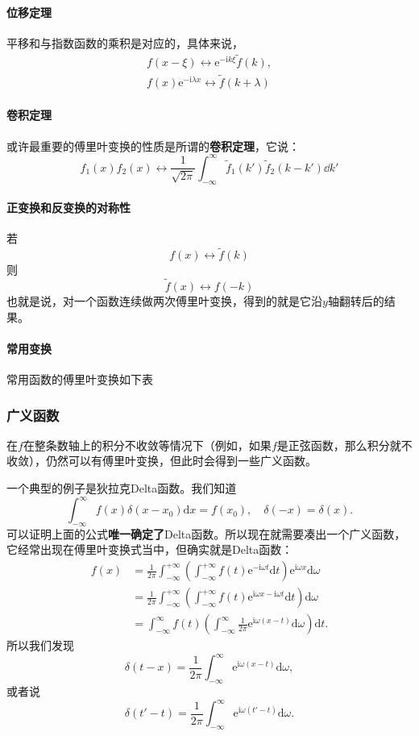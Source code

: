 \documentclass[UTF8]{ctexart}
\newcommand*{\ii}{\mathrm{i}}
\newcommand*{\ee}{\mathrm{e}}
\begin{document}
\paragraph{位移定理} 平移和与指数函数的乘积是对应的，具体来说，
\[
    \begin{split}
        f(x - \xi) \longleftrightarrow \ee^{-\ii k \xi} \tilde{f}(k), \\
        f(x) \ee^{-\ii \lambda x} \longleftrightarrow \tilde{f}(k + \lambda)
    \end{split}
\]

\paragraph{卷积定理} 或许最重要的傅里叶变换的性质是所谓的\textbf{卷积定理}，它说：
\[
    f_1(x) f_2(x) \longleftrightarrow \frac{1}{\sqrt{2\pi}} \int_{-\infty}^\infty \tilde{f}_1(k') \tilde{f}_2(k - k') \dd k'
\]

\paragraph{正变换和反变换的对称性} 若
\[
    f(x) \longleftrightarrow \tilde{f}(k)
\]
则
\[
    \tilde{f}(x) \longleftrightarrow f(-k)
\] 
也就是说，对一个函数连续做两次傅里叶变换，得到的就是它沿$y$轴翻转后的结果。

\paragraph{常用变换} 常用函数的傅里叶变换如下表


\subsubsection{广义函数}

在$f$在整条数轴上的积分不收敛等情况下（例如，如果$f$是正弦函数，那么积分就不收敛），仍然可以有傅里叶变换，但此时会得到一些广义函数。

一个典型的例子是狄拉克Delta函数。我们知道
\[
\int_{-\infty}^\infty f(x) \delta(x-x_0) \mathrm{d}x = f(x_0), \quad \delta(-x) = \delta(x).
\]
可以证明上面的公式\textbf{唯一确定了}Delta函数。所以现在就需要凑出一个广义函数，它经常出现在傅里叶变换式当中，但确实就是Delta函数：
\[
\begin{aligned}
    f(x) &= \frac{1}{2\pi} \int_{-\infty}^{+\infty} \left(\int_{-\infty}^{+\infty} f(t) \ee^{-\mathrm{i} \omega t} \mathrm{d}t \right) \ee^{\mathrm{i} \omega x} \mathrm{d} \omega \\
    &= \frac{1}{2\pi} \int_{-\infty}^{+\infty} \left(\int_{-\infty}^{+\infty} f(t) \ee^{\mathrm{i} \omega x -\mathrm{i} \omega t} \mathrm{d}t \right) \mathrm{d} \omega \\
    &= \int_{-\infty}^\infty f(t) \left( \int_{-\infty}^\infty \frac{1}{2\pi} \ee^{\mathrm{i} \omega (x-t)} \mathrm{d}\omega \right) \mathrm{d}t.
\end{aligned}
\]
所以我们发现
\[
\delta(t-x) = \frac{1}{2\pi} \int_{-\infty}^\infty \ee^{\mathrm{i} \omega (x-t)} \mathrm{d}\omega, 
\]
或者说
\[
\delta(t'-t) = \frac{1}{2\pi} \int_{-\infty}^\infty \ee^{\mathrm{i} \omega (t'-t)} \mathrm{d}\omega.
\]
\end{document}
